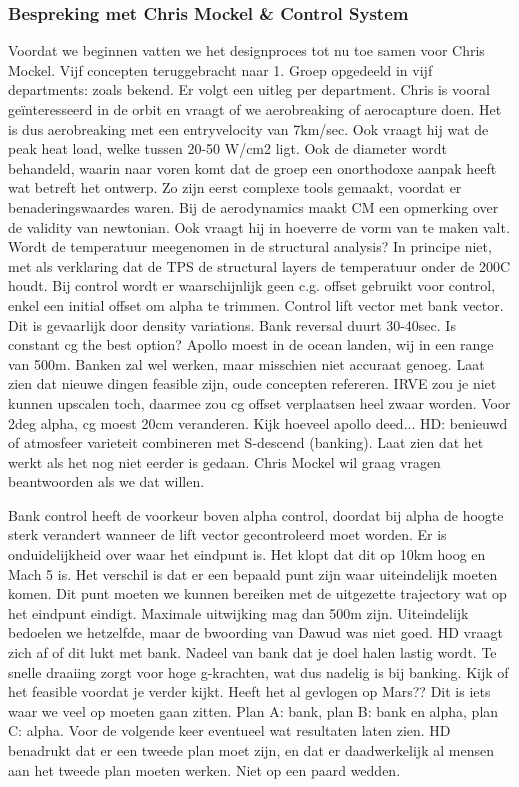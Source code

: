 \subsubsection{Bespreking met Chris Mockel \& Control System}
Voordat we beginnen vatten we het designproces tot nu toe samen voor Chris Mockel. Vijf concepten teruggebracht naar 1. Groep opgedeeld in vijf departments: zoals bekend. Er volgt een uitleg per department. Chris is vooral ge\"{i}nteresseerd in de orbit en vraagt of we aerobreaking of aerocapture doen. Het is dus aerobreaking met een entryvelocity van 7km/sec. Ook vraagt hij wat de peak heat load, welke tussen 20-50 W/cm2 ligt. Ook de diameter wordt behandeld, waarin naar voren komt dat de groep een onorthodoxe aanpak heeft wat betreft het ontwerp. Zo zijn eerst complexe tools gemaakt, voordat er benaderingswaardes waren. Bij de aerodynamics maakt CM een opmerking over de validity van newtonian. Ook vraagt hij in hoeverre de vorm van te maken valt. Wordt de temperatuur meegenomen in de structural analysis? In principe niet, met als verklaring dat de TPS de structural layers de temperatuur onder de 200C houdt. Bij control wordt er waarschijnlijk geen c.g. offset gebruikt voor control, enkel een initial offset om alpha te trimmen. Control lift vector met bank vector. Dit is gevaarlijk door density variations. Bank reversal duurt 30-40sec. Is constant cg the best option? Apollo moest in de ocean landen, wij in een range van 500m. Banken zal wel werken, maar misschien niet accuraat genoeg. Laat zien dat nieuwe dingen feasible zijn, oude concepten refereren. IRVE zou je niet kunnen upscalen toch, daarmee zou cg offset verplaatsen heel zwaar worden. Voor 2deg alpha, cg moest 20cm veranderen. Kijk hoeveel apollo deed... HD: benieuwd of atmosfeer varieteit combineren met S-descend (banking). Laat zien dat het werkt als het nog niet eerder is gedaan. Chris Mockel wil graag vragen beantwoorden als we dat willen.

Bank control heeft de voorkeur boven alpha control, doordat bij alpha de hoogte sterk verandert wanneer de lift vector gecontroleerd moet worden. Er is onduidelijkheid over waar het eindpunt is. Het klopt dat dit op 10km hoog en Mach 5 is. Het verschil is dat er een bepaald punt zijn waar uiteindelijk moeten komen. Dit punt moeten we kunnen bereiken met de uitgezette trajectory wat op het eindpunt eindigt. Maximale uitwijking mag dan 500m zijn. Uiteindelijk bedoelen we hetzelfde, maar de bwoording van Dawud was niet goed. HD vraagt zich af of dit lukt met bank. Nadeel van bank dat je doel halen lastig wordt. Te snelle draaiing zorgt voor hoge g-krachten, wat dus nadelig is bij banking. Kijk of het feasible voordat je verder kijkt. Heeft het al gevlogen op Mars?? Dit is iets waar we veel op moeten gaan zitten. Plan A: bank, plan B: bank en alpha, plan C: alpha. Voor de volgende keer eventueel wat resultaten laten zien. HD benadrukt dat er een tweede plan moet zijn, en dat er daadwerkelijk al mensen aan het tweede plan moeten werken. Niet op een paard wedden.

